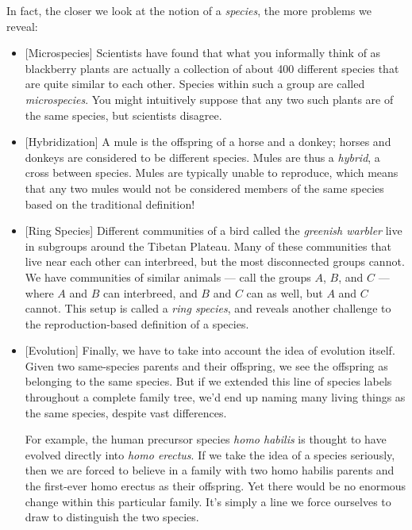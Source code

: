 \documentclass[9pt, twoside]{book}
\theoremstyle{argtstyle}
\begin{document}
In fact, the closer we look at the notion of a {\em species}, the more problems
we reveal:
\begin{itemize}
    \item{} [Microspecies] Scientists have found that what you informally
        think of as blackberry plants are actually a
        collection of about 400
        different species that are quite similar to each other.
        Species within such a group are called {\em microspecies}.
        You might intuitively
        suppose that any two such plants are of the same species,
        but scientists disagree.
    \item{} [Hybridization] A mule is the offspring of a horse and a donkey;
        horses and donkeys are considered to be different species.
        Mules are thus a {\em hybrid}, a cross between species.
        Mules are typically unable to reproduce, which means that
        any two mules would not be considered members of the same
        species based on the traditional definition!
    \item{} [Ring Species] Different communities of a bird called the
        {\em greenish warbler} live in subgroups around the Tibetan Plateau.
        Many of these communities that live near each other can interbreed, but
        the most disconnected groups cannot. We have
        communities of similar animals --- call the groups $A$, $B$, and $C$ ---
        where $A$ and $B$ can interbreed, and $B$ and $C$ can as well, but $A$
        and $C$ cannot. This setup is called a {\em ring species}, and reveals
        another challenge to the reproduction-based definition of a species.
    \item{} [Evolution] Finally, we have to take into account the idea of
        evolution itself.
        Given two same-species parents and their offspring, we see the
        offspring as belonging to the same species.
        But if we extended this line of
        species labels throughout a complete family tree, we'd end up naming
        many living things as the same species, despite vast differences.

        For example, the human precursor species {\em homo habilis} is
        thought to have evolved directly into {\em homo erectus}.
        If we take the idea of a species seriously,
        then we are forced to believe in a family
        with two homo habilis parents and
        the first-ever homo erectus as their offspring.
        Yet there would be no enormous
        change within this particular family.
        It's simply a line we force
        ourselves to draw to distinguish the two species.
\end{itemize}
\end{document}
